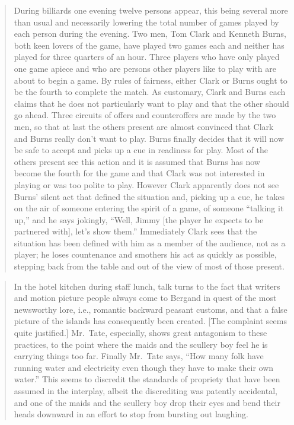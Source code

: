 \documentclass[openany,nobib]{tufte-book}
\begin{document}
\begin{quote}
During billiards one evening twelve persons appear, this being several
more than usual and necessarily lowering the total number of games
played by each person during the evening. Two men, Tom Clark and Kenneth
Burns, both keen lovers of the game, have played two games each and
neither has played for three quarters of an hour. Three players who have
only played one game apiece and who are persons other players like to
play with are about to begin a game. By rules of fairness, either Clark
or Burns ought to be the fourth to complete the match. As customary,
Clark and Burns each claims that he does not particularly want to play
and that the other should go ahead. Three circuits of offers and
counteroffers are made by the two men, so that at last the others
present are almost convinced that Clark and Burns really don't want to
play. Burns finally decides that it will now be safe to accept and picks
up a cue in readiness for play. Most of the others present see this
action and it is assumed that Burns has now become the fourth for the
game and that Clark was not interested in playing or was too polite to
play. However Clark apparently does not see Burns' silent act that
defined the situation and, picking up a cue, he takes on the air of
someone entering the spirit of a game, of someone ``talking it up,'' and
he says jokingly, ``Well, Jimmy {[}the player he expects to be partnered
with{]}, let's show them.'' Immediately Clark sees that the situation
has been defined with him as a member of the audience, not as a player;
he loses countenance and smothers his act as quickly as possible,
stepping back from the table and out of the view of most of those
present.
\end{quote}

\begin{quote}
In the hotel kitchen during staff lunch, talk turns to the fact that
writers and motion picture people always come to Bergand in quest of the
most newsworthy lore, i.e., romantic backward peasant customs, and that
a false picture of the islands has consequently been created. {[}The
complaint seems quite justified.{]} Mr.~Tate, especially, shows great
antagonism to these practices, to the point where the maids and the
scullery boy feel he is carrying things too far. Finally Mr.~Tate says,
``How many folk have running water and electricity even though they have
to make their own water.'' This seems to discredit the standards of
propriety that have been assumed in the interplay, albeit the
discrediting was patently accidental, and one of the maids and the
scullery boy drop their eyes and bend their heads downward in an effort
to stop from bursting out laughing.
\end{quote}
\end{document}
